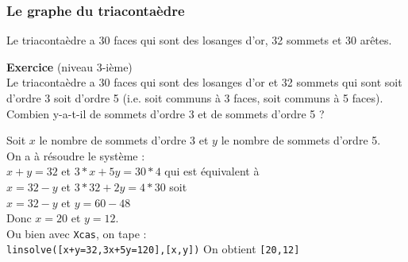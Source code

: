 \documentclass[a4paper,11pt]{book}
\begin{document}
\subsubsection{Le graphe du triaconta\`edre}
Le triaconta\`edre a 30 faces qui sont des losanges d'or, 32 sommets et 30 ar\^etes.

{\bf Exercice} (niveau 3-i\`eme)\\
Le triaconta\`edre a 30 faces qui sont des losanges d'or et 32 sommets qui sont
soit d'ordre 3 soit d'ordre 5 (i.e. soit communs \`a 3 faces, soit communs \`a 
5 faces).\\
Combien y-a-t-il de sommets d'ordre 3 et de sommets d'ordre 5 ?

Soit $x$ le nombre de sommets d'ordre 3 et $y$ le nombre de sommets d'ordre 5.\\
On a \`a r\'esoudre le syst\`eme :\\
$x+y=32$ et $3*x+5y=30*4$ qui est \'equivalent \`a \\
$x=32-y$ et $3*32+2y=4*30$ soit\\
$x=32-y$ et $y=60-48$\\
Donc $x=20$ et $y=12$.\\
Ou bien avec {\tt Xcas}, on tape  :\\
{\tt linsolve([x+y=32,3x+5y=120],[x,y])}
On obtient {\tt [20,12]}
\end{document}

